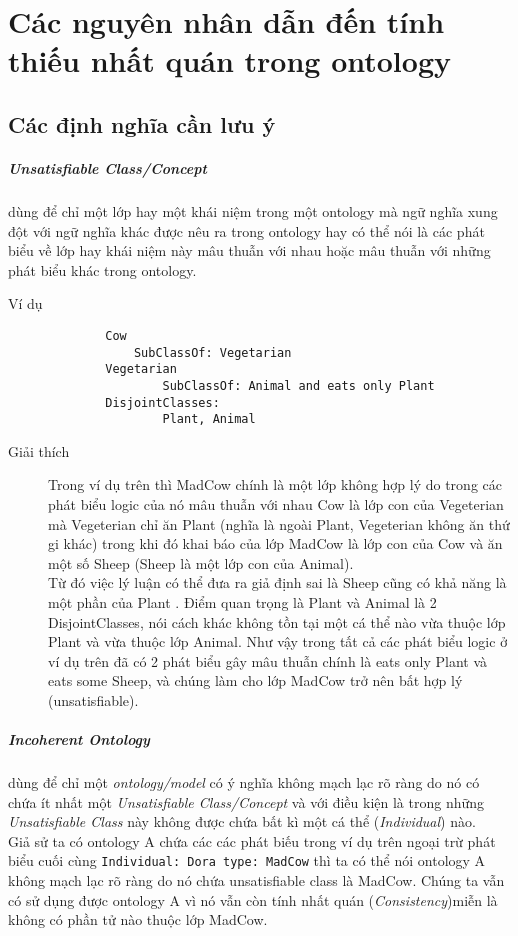 \chapter{Các nguyên nhân dẫn đến tính thiếu nhất quán trong ontology}

\section{Các định nghĩa cần lưu ý \cite{satisfy}}
\paragraph{Unsatisfiable Class/Concept} dùng để chỉ một lớp hay một khái niệm trong một ontology mà ngữ nghĩa xung đột với ngữ nghĩa khác được nêu ra trong ontology hay có thể nói là các phát biểu về lớp hay khái niệm này mâu thuẫn với nhau hoặc mâu thuẫn với những phát biểu khác trong ontology.
\begin{description}
\item[Ví dụ]
\begin{verbatim}
		Cow
   	 		SubClassOf: Vegetarian
		Vegetarian
    			SubClassOf: Animal and eats only Plant
		DisjointClasses:
    			Plant, Animal
\end{verbatim}
\item[Giải thích]
Trong ví dụ trên thì MadCow chính là một lớp không hợp lý do trong các phát biểu logic của nó mâu thuẫn với nhau Cow là lớp con của Vegeterian mà Vegeterian chỉ ăn Plant (nghĩa là ngoài Plant, Vegeterian không ăn thứ gi khác) trong khi đó khai báo của lớp MadCow là lớp con của Cow và ăn một số Sheep (Sheep là một lớp con của Animal).
\\
Từ đó việc lý luận có thể đưa ra giả định sai là Sheep cũng có khả năng là một phần của Plant . Điểm quan trọng là Plant và Animal là 2 DisjointClasses, nói cách khác không tồn tại một cá thể nào vừa thuộc lớp Plant và vừa thuộc lớp Animal. Như vậy trong tất cả các phát biểu logic ở ví dụ trên đã có 2 phát biểu gây mâu thuẫn chính là eats only Plant và eats some Sheep, và chúng làm cho lớp MadCow trở nên bất hợp lý (unsatisfiable).
\end{description}
\paragraph{Incoherent Ontology} dùng để chỉ một \textit{ontology/model} có ý nghĩa không mạch lạc rõ ràng do nó có chứa ít nhất một \textit{Unsatisfiable Class/Concept} và với điều kiện là trong những \textit{Unsatisfiable Class} này không được chứa bất kì một cá thể (\textit{Individual}) nào.
\\
\hspace{0.05\textwidth} Giả sử ta có ontology A chứa các các phát biếu trong ví dụ trên ngoại trừ phát biểu cuối cùng \texttt{Individual: Dora type: MadCow} thì ta có thể nói ontology A không mạch lạc rõ ràng do nó chứa unsatisfiable class là MadCow. Chúng ta vẫn có sử dụng được ontology A vì nó vẫn còn tính nhất quán (\textit{Consistency})miễn là không có phần tử nào thuộc lớp MadCow.
